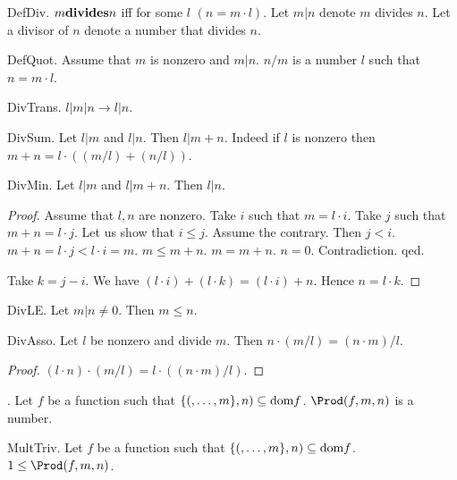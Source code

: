 \begin{axiom}
\begin{lemma}
\begin{definition}

\begin{definition} DefDiv.
$m {\bf divides} n$ iff for some $l$ $(n = m \cdot l)$.
Let $m | n$ denote $m$ divides $n$.
Let a divisor of $n$ denote a number that divides $n$.
\end{definition}

\begin{definition} DefQuot.
Assume that $m$ is nonzero and $m | n$.
$n / m$ is a number $l$ such that $n = m \cdot l$.
\end{definition}

\begin{lemma} DivTrans. $l | m | n \rightarrow l | n$.
\end{lemma}

\begin{lemma} DivSum.
Let $l | m$ and $l | n$. Then $l | m + n$.
Indeed if $l$ is nonzero then 
$m + n = l \cdot ((m / l) + (n / l))$.
\end{lemma}

\begin{lemma} DivMin.
Let $l | m$ and $l | m + n$. Then $l | n$.
\begin{proof}
Assume that $l,n$ are nonzero.
Take $i$ such that $m = l \cdot i$. 
Take $j$ such that $m + n = l \cdot j$.
Let us show that $i \leq j$.
Assume the contrary. Then $j < i$.
$m+n = l \cdot j < l \cdot i = m$. 
$m \leq m+n$.
$m = m+n$. $n=0$.
Contradiction. qed.
 
Take $k = j - i$.
We have $(l \cdot i) + (l \cdot k) = (l \cdot i) + n$.
Hence $n = l \cdot k$.
\end{proof}

\begin{lemma} DivLE.
Let $m | n \neq 0$. Then $m \leq n$.
\end{lemma}

\begin{lemma} DivAsso.
Let $l$ be nonzero and divide $m$.
Then $n \cdot (m / l) = (n \cdot m) / l$.\end{lemma}
\begin{proof}
$(l \cdot n) \cdot (m / l) = l \cdot ((n \cdot m) / l)$.
\end{proof}

\begin{signature}.  
Let $f$ be a function such that $\{(,\dots,m\},n) \subseteq \text{dom} f$.
$\Prod(f,m,n)$ is a number.
\end{signature}

\begin{axiom} MultTriv.
Let $f$ be a function such that $\{(,\dots,m\},n) \subseteq \text{dom} f$.
$1 \leq \Prod(f,m,n)$.
\end{axiom}


\end{lemma}
\end{definition}
\end{lemma}
\end{axiom}
